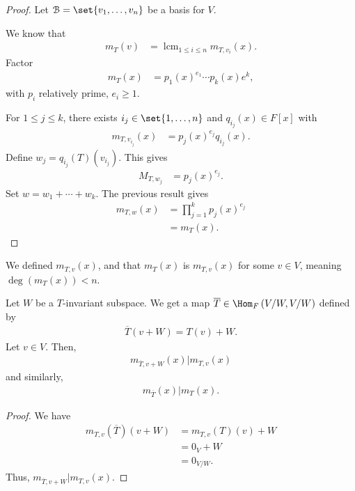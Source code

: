 \documentclass[10pt]{mypackage}
\DeclareMathOperator*{\lcm}{lcm}
\begin{document}
\begin{proof}
  Let $\mathcal{B} = \set{v_1,\dots,v_n}$ be a basis for $V$.\newline

  We know that
  \begin{align*}
    m_{T}\left(v\right) &= \lcm_{1 \leq i \leq n} m_{T,v_i}(x).
  \end{align*}
  Factor
  \begin{align*}
    m_T(x) &= p_1(x)^{e_1} \cdots p_{k}(x)e^{k},
  \end{align*}
  with $p_i$ relatively prime, $e_i \geq 1$.\newline

  For $1 \leq j \leq k$, there exists $i_j\in \set{1,\dots,n}$ and $q_{i_j}(x)\in F[x]$ with
  \begin{align*}
    m_{T,v_{i_j}}(x) &= p_j(x)^{e_j}q_{i_j}(x).
  \end{align*}
  Define $w_j = q_{i_j}(T)\left(v_{i_j}\right)$. This gives
  \begin{align*}
    M_{T,w_j} &= p_j(x)^{e_j}.
  \end{align*}
  Set $w = w_1 + \cdots + w_k$. The previous result gives
  \begin{align*}
    m_{T,w}(x) &= \prod_{j=1}^{k}p_j(x)^{e_j}\\
               &= m_T(x).
  \end{align*}
\end{proof}
\begin{recall}
  We defined $m_{T,v}(x)$, and that $m_T(x)$ is $m_{T,v}(x)$ for some $v\in V$, meaning $\deg\left(m_T(x)\right) < n$.
\end{recall}
\begin{lemma}
  Let $W$ be a $T$-invariant subspace. We get a map $\overline{T}\in\Hom_{F}\left(V/W,V/W\right)$ defined by
  \begin{align*}
    \overline{T}\left(v+W\right) = T(v) + W.
  \end{align*}
  Let $v\in V$. Then,
  \begin{align*}
    m_{\overline{T},v+W}(x)|m_{T,v}(x)
  \end{align*}
  and similarly,
  \begin{align*}
    m_{\overline{T}}(x) | m_T(x).
  \end{align*}
\end{lemma}
\begin{proof}
  We have
  \begin{align*}
    m_{T,v}\left(\overline{T}\right)\left(v+W\right) &= m_{T,v}\left(T\right)(v) + W\\
                                                     &= 0_V + W\\
                                                     &= 0_{V/W}.
  \end{align*}
  Thus, $m_{\overline{T},v+W}|m_{T,v}(x)$.
\end{proof}
\end{document}
